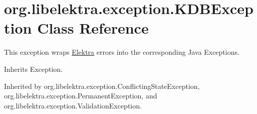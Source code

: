 \hypertarget{classorg_1_1libelektra_1_1exception_1_1KDBException}{}\section{org.\+libelektra.\+exception.\+K\+D\+B\+Exception Class Reference}
\label{classorg_1_1libelektra_1_1exception_1_1KDBException}


This exception wraps \hyperlink{interfaceorg_1_1libelektra_1_1Elektra}{Elektra} errors into the corresponding Java Exceptions.  




Inherits Exception.



Inherited by org.\+libelektra.\+exception.\+Conflicting\+State\+Exception, org.\+libelektra.\+exception.\+Permanent\+Exception, and org.\+libelektra.\+exception.\+Validation\+Exception.

